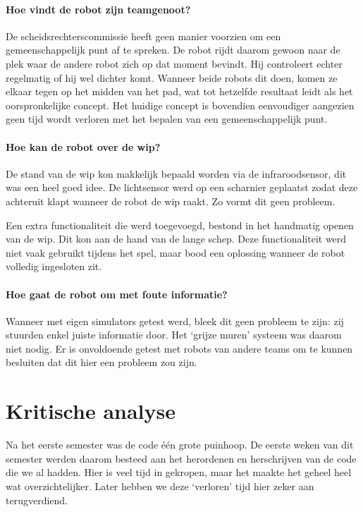 \documentclass[eind]{penoverslag}
\begin{document}
\paragraph{Hoe vindt de robot zijn teamgenoot?}
De scheidsrechterscommissie heeft geen manier voorzien om een gemeenschappelijk punt af te spreken. De robot rijdt daarom gewoon naar de plek waar de andere robot zich op dat moment bevindt. Hij controleert echter regelmatig of hij wel dichter komt. Wanneer beide robots dit doen, komen ze elkaar tegen op het midden van het pad, wat tot hetzelfde resultaat leidt als het oorspronkelijke concept. Het huidige concept is bovendien eenvoudiger aangezien geen tijd wordt verloren met het bepalen van een gemeenschappelijk punt.

\paragraph{Hoe kan de robot over de wip?}
De stand van de wip kon makkelijk bepaald worden via de infraroodsensor, dit was een heel goed idee. De lichtsensor werd op een scharnier geplaatst zodat deze achteruit klapt wanneer de robot de wip raakt. Zo vormt dit geen probleem.

Een extra functionaliteit die werd toegevoegd, bestond in het handmatig openen van de wip. Dit kon aan de hand van de lange schep. Deze functionaliteit werd niet vaak gebruikt tijdens het spel, maar bood een oplossing wanneer de robot volledig ingesloten zit.

\paragraph{Hoe gaat de robot om met foute informatie?}
Wanneer met eigen simulators getest werd, bleek dit geen probleem te zijn: zij stuurden enkel juiste informatie door. Het `grijze muren' systeem was daarom niet nodig. Er is onvoldoende getest met robots van andere teams om te kunnen besluiten dat dit hier een probleem zou zijn.

\section{Kritische analyse}
\label{Asec:kritisch}
Na het eerste semester was de code \'e\'en grote puinhoop. De eerste weken van dit semester werden daarom besteed aan het herordenen en herschrijven van de code die we al hadden. Hier is veel tijd in gekropen, maar het maakte het geheel heel wat overzichtelijker. Later hebben we deze `verloren' tijd hier zeker aan terugverdiend.\\
\end{document}
